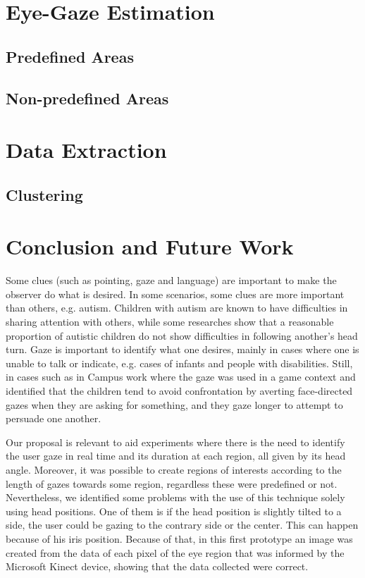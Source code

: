 \documentclass[10pt, conference]{IEEEtran}
\begin{document}
\section{Eye-Gaze Estimation} \label{sec:eyeGazeEstimation}

\subsection{Predefined Areas}

\subsection{Non-predefined Areas}

\section{Data Extraction} \label{sec:dataExtraction}

\subsection{Clustering}

\section{Conclusion and Future Work} \label{sec:conclusionAndFutureWork}
Some clues (such as pointing, gaze and language) are important to make the observer do what is desired. 
In some scenarios, some clues are more important than others, e.g. autism.
Children with autism are known to have difficulties in sharing attention with others, while some researches \cite{14} show that a reasonable proportion of autistic children do not show difficulties in following another's head turn.
Gaze is important to identify what one desires, mainly in cases where one is unable to talk or indicate, e.g. cases of infants and people with disabilities.
Still, in cases such as in Campus work where the gaze was used in a game context and identified that the children tend to avoid confrontation by averting face-directed gazes when they are asking for something, and they gaze longer to attempt to persuade one another.

Our proposal is relevant to aid experiments where there is the need to identify the user gaze in real time and its duration at each region, all given by its head angle.
Moreover, it was possible to create regions of interests according to the length of gazes towards some region, regardless these were predefined or not.
Nevertheless, we identified some problems with the use of this technique solely using head positions. 
One of them is if the head position is slightly tilted to a side, the user could be gazing to the contrary side or the center. 
This can happen because of his iris position. 
Because of that, in this first prototype an image was created from the data of each pixel of the eye region that was informed by the Microsoft Kinect device, showing that the data collected were correct. 
\end{document}
